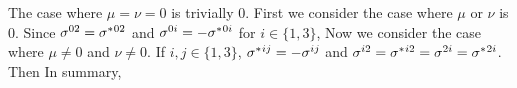 \documentclass[11pt]{article}
\begin{document}
{	The case where $\mu = \nu = 0$ is trivially 0.  First we consider the case where $\mu$ or $\nu$ is 0.  Since $\sigma^{0 2} = \sigma^*{}^{0 2}$ and $\sigma^{0 i} = -\sigma^*{}^{0 i}$ for $i \in \{1, 3\}$,
	Now we consider the case where $\mu \neq 0$ and $\nu \neq 0$.  If $i, j \in \{1, 3\}$, $\sigma^*{}^{i j} = -\sigma^{i j}$ and $\sigma^{i 2} = \sigma^*{}^{i 2} = \sigma^{2 i} = \sigma^*{}^{2 i}$.  Then
	In summary,
	
}
\end{document}
